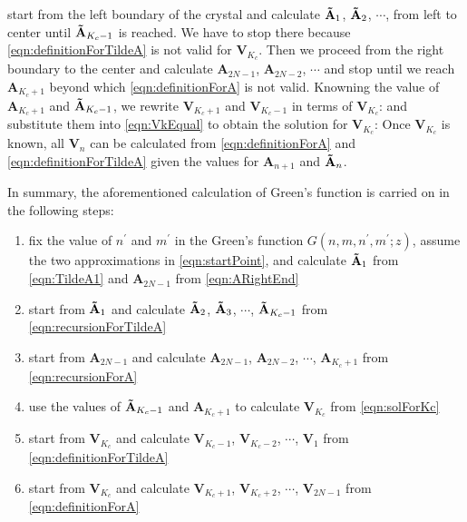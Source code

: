start from the left boundary of the crystal and calculate $\mathbf{\Tilde{A}}_{1}$, 
$\mathbf{\Tilde{A}}_{2}$, $\cdots$, from left to
center until $\mathbf{\Tilde{A}}_{K_c - 1}$ is reached. We have to stop there because  
\autoref{eqn:definitionForTildeA} is not valid for  $\mathbf{V}_{K_c}$. 
Then we proceed from the right boundary to the center and calculate $\mathbf{A}_{2N-1}$, 
$\mathbf{A}_{2N-2}$, $\cdots$ and stop until we reach $\mathbf{A}_{K_c + 1}$ beyond which
\autoref{eqn:definitionForA} is not valid. Knowning the value of $\mathbf{A}_{K_c + 1}$ and 
$\mathbf{\Tilde{A}}_{K_c - 1}$, we rewrite $\mathbf{V}_{K_c +1}$ and $\mathbf{V}_{K_c - 1}$ in terms of
 $\mathbf{V}_{K_c}$:
and substitute them into \autoref{eqn:VkEqual} to obtain the solution for $\mathbf{V}_{K_c}$:
Once $\mathbf{V}_{K_c}$ is known, all $\mathbf{V}_{n}$ can be calculated from \autoref{eqn:definitionForA} and
\autoref{eqn:definitionForTildeA} given the values for $\mathbf{A}_{n+1}$ and $\mathbf{\Tilde{A}}_{n}$.

In summary, the aforementioned calculation of Green's function is carried on in the following steps: 
\begin{enumerate}
\item{fix the value of $n^{\prime}$ and $m^{\prime}$ in the Green's function $G(n, m, n^{\prime}, m^{\prime}; z)$, 
assume the two approximations in \autoref{eqn:startPoint}, and calculate $\mathbf{\Tilde{A}}_{1}$ from 
\autoref{eqn:TildeA1} and $\mathbf{A}_{2N-1}$ from \autoref{eqn:ARightEnd} }
\item{start from $\mathbf{\Tilde{A}}_{1}$ and calculate $\mathbf{\Tilde{A}}_{2}$, $\mathbf{\Tilde{A}}_{3}$, $\cdots$, 
$\mathbf{\Tilde{A}}_{K_c - 1}$ from \autoref{eqn:recursionForTildeA} }
\item{start from $\mathbf{A}_{2N-1}$ and calculate $\mathbf{A}_{2N-1}$, 
$\mathbf{A}_{2N-2}$, $\cdots$, $\mathbf{A}_{K_c + 1}$ from \autoref{eqn:recursionForA} }
\item{use the values of $\mathbf{\Tilde{A}}_{K_c - 1}$ and $\mathbf{A}_{K_c + 1}$ to calculate $\mathbf{V}_{K_c}$ 
from \autoref{eqn:solForKc} }
\item{start from $\mathbf{V}_{K_c}$ and calculate $\mathbf{V}_{K_c-1}$, $\mathbf{V}_{K_c-2}$, $\cdots$, 
$\mathbf{V}_{1}$ from \autoref{eqn:definitionForTildeA} }
\item{start from $\mathbf{V}_{K_c}$ and calculate $\mathbf{V}_{K_c+1}$, $\mathbf{V}_{K_c+2}$, $\cdots$, $\mathbf{V}_{2N-1}$ from \autoref{eqn:definitionForA} }
\end{enumerate}

